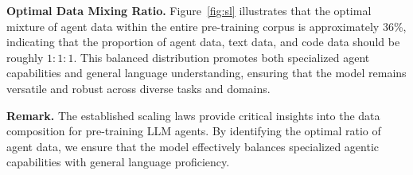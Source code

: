 \noindent\textbf{Optimal Data Mixing Ratio.}
Figure~\ref{fig:sl} illustrates that the optimal mixture of agent data within the entire pre-training corpus is approximately 36\%, indicating that the proportion of agent data, text data, and code data should be roughly $1:1:1$.
This balanced distribution promotes both specialized agent capabilities and general language understanding, ensuring that the model remains versatile and robust across diverse tasks and domains.

\noindent\textbf{Remark.} The established scaling laws provide critical insights into the data composition for pre-training LLM agents. By identifying the optimal ratio of agent data, we ensure that the model effectively balances specialized agentic capabilities with general language proficiency. 


